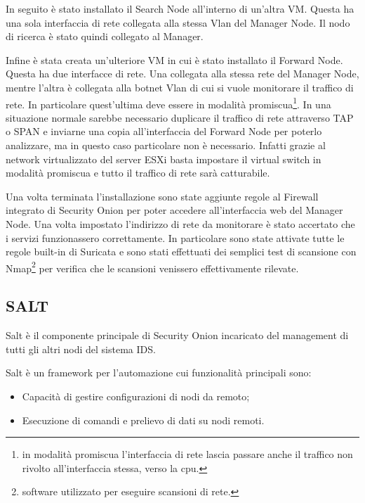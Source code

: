 In seguito è stato installato il Search Node all'interno di un'altra VM. Questa ha una sola interfaccia di rete collegata alla stessa Vlan del Manager Node. Il nodo di ricerca è stato quindi collegato al Manager.

Infine è stata creata un'ulteriore VM in cui è stato installato il Forward Node. Questa ha due interfacce di rete. Una collegata alla stessa rete del Manager Node, mentre l'altra è collegata alla botnet Vlan di cui si vuole monitorare il traffico di rete. In particolare quest'ultima deve essere in modalità promiscua\footnote{in modalità promiscua l'interfaccia di rete lascia passare anche il traffico non rivolto all'interfaccia stessa, verso la cpu.}.
In una situazione normale sarebbe necessario duplicare il traffico di rete attraverso TAP o SPAN e inviarne una copia all'interfaccia del Forward Node per poterlo analizzare, ma in questo caso particolare non è necessario. Infatti grazie al network virtualizzato del server ESXi basta impostare il virtual switch in modalità promiscua e tutto il traffico di rete sarà catturabile.

Una volta terminata l'installazione sono state aggiunte regole al Firewall integrato di Security Onion per poter accedere all'interfaccia web del Manager Node. 
Una volta impostato l'indirizzo di rete da monitorare è stato accertato che i servizi funzionassero correttamente.
In particolare sono state attivate tutte le regole built-in di Suricata e sono stati effettuati dei semplici test di scansione con Nmap\footnote{software utilizzato per eseguire scansioni di rete.} \cite{nmap}  per verifica che le scansioni venissero effettivamente  rilevate.



\subsection{SALT}


Salt \cite{salt} è il componente principale di Security Onion incaricato del management di tutti gli altri nodi del sistema  IDS.

Salt è un framework per l'automazione cui funzionalità principali sono:
\begin{itemize}
    \item Capacità di gestire configurazioni di nodi da remoto;
    \item Esecuzione di comandi  e prelievo di dati su nodi remoti.
\end{itemize}

